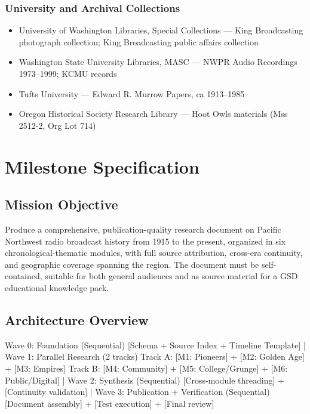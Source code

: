 \documentclass[11pt,letterpaper]{article}
\newcommand{\stageheader}[2]{%
  \noindent\colorbox{#2}{\makebox[\textwidth][l]{%
    \textcolor{white}{\bfseries\sffamily\hspace{6pt}#1\hspace{6pt}}}}%
  \vspace{0.5em}\par%
}
\begin{document}
\subsubsection{University and Archival Collections}

\begin{itemize}[leftmargin=2em]
\item University of Washington Libraries, Special Collections --- King Broadcasting photograph collection; King Broadcasting public affairs collection
\item Washington State University Libraries, MASC --- NWPR Audio Recordings 1973--1999; KCMU records
\item Tufts University --- Edward R. Murrow Papers, ca 1913--1985
\item Oregon Historical Society Research Library --- Hoot Owls materials (Mss 2512-2, Org Lot 714)
\end{itemize}

\newpage

\stageheader{STAGE 3 --- MISSION PACKAGE}{tertiary}

\section{Milestone Specification}

\subsection{Mission Objective}

Produce a comprehensive, publication-quality research document on Pacific Northwest radio broadcast history from 1915 to the present, organized in six chronological-thematic modules, with full source attribution, cross-era continuity, and geographic coverage spanning the region. The document must be self-contained, suitable for both general audiences and as source material for a GSD educational knowledge pack.

\subsection{Architecture Overview}

\begin{asciibox}
Wave 0: Foundation (Sequential)
  [Schema + Source Index + Timeline Template]
         |
Wave 1: Parallel Research (2 tracks)
  Track A: [M1: Pioneers] + [M2: Golden Age] + [M3: Empires]
  Track B: [M4: Community] + [M5: College/Grunge] + [M6: Public/Digital]
         |
Wave 2: Synthesis (Sequential)
  [Cross-module threading] + [Continuity validation]
         |
Wave 3: Publication + Verification (Sequential)
  [Document assembly] + [Test execution] + [Final review]
\end{asciibox}
\end{document}
